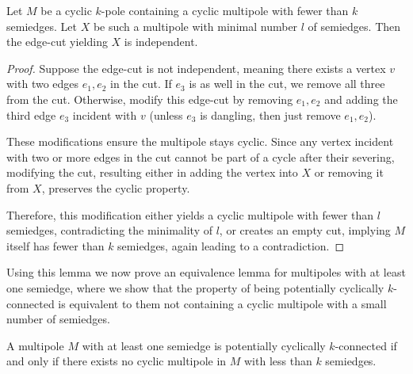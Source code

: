 \documentclass[12pt, twoside]{book}
\begin{document}
\begin{lemma}\label{lem:smallest-cut-in-mpoles-is-independent}
	Let $M$ be a cyclic $k$-pole containing a cyclic multipole with fewer than $k$ semiedges. Let $X$ be such a multipole with minimal number $l$ of semiedges. Then the edge-cut yielding $X$ is independent.
\end{lemma}

\begin{proof}
	Suppose the edge-cut is not independent, meaning there exists a vertex $v$ with two edges $e_1,e_2$ in the cut. If $e_3$ is as well in the cut, we remove all three from the cut. Otherwise, modify this edge-cut by removing $e_1,e_2$ and adding the third edge $e_3$ incident with $v$ (unless $e_3$ is dangling, then just remove $e_1,e_2$).
	
	These modifications ensure the multipole stays cyclic. Since any vertex incident with two or more edges in the cut cannot be part of a cycle after their severing, modifying the cut, resulting either in adding the vertex into $X$ or removing it from $X$, preserves the cyclic property.
	
	Therefore, this modification either yields a cyclic multipole with fewer than $l$ semiedges, contradicting the minimality of $l$, or creates an empty cut, implying $M$ itself has fewer than $k$ semiedges, again leading to a contradiction.
\end{proof}

Using this lemma we now prove an equivalence lemma for multipoles with at least one semiedge, where we show that the property of being potentially cyclically \mbox{$k$-connected} is equivalent to them not containing a cyclic multipole with a small number of semiedges.

\begin{lemma}
	A multipole $M$ with at least one semiedge is potentially cyclically $k$-connected if and only if  there exists no cyclic multipole in $M$ with less than $k$ semiedges.
\end{lemma}
\end{document}
